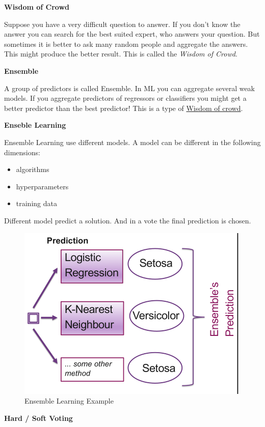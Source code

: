 \documentclass[11pt,twoside,landscape]{article}
\begin{document}
\begin{multicols}{3}
\textbf{Wisdom of Crowd}

Suppose you have a very difficult question to answer.
If you don't know the answer you can search for the best suited expert, who answers your question.
But sometimes it is better to ask many random people and aggregate the answers.
This might produce the better result.
This is called the \emph{Wisdom of Crowd}.

\textbf{Ensemble}

A group of predictors is called Ensemble.
In ML you can aggregate several weak models.
If you aggregate predictors of regressors or classifiers you might get a better predictor than the best predictor!
This is a type of \href{../../../roam/20211228083830-wisdom_of_crowd.org}{Wisdom of crowd}.

\textbf{Enseble Learning}

Ensemble Learning use different models.
A model can be different in the following dimensions:
\begin{itemize}
\item algorithms
\item hyperparameters
\item training data
\end{itemize}


Different model predict a solution.
And in a vote the final prediction is chosen.

\begin{figure}[htbp]
\centering
\includegraphics[width=.9\linewidth]{img/ensemble_learning_example.png}
\caption{Ensemble Learning Example}
\end{figure}


\textbf{Hard / Soft Voting}


\end{multicols}
\end{document}
